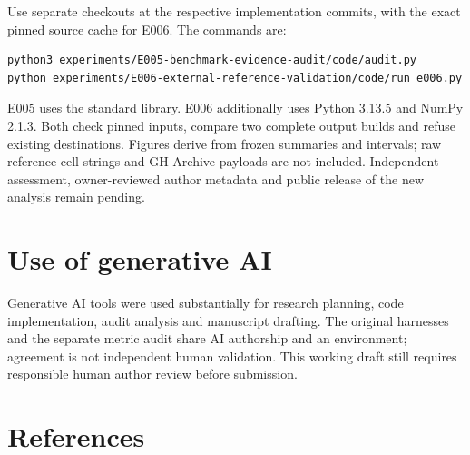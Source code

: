 Use separate checkouts at the respective implementation commits, with
the exact pinned source cache for E006. The commands are:

\begin{verbatim}
python3 experiments/E005-benchmark-evidence-audit/code/audit.py
python experiments/E006-external-reference-validation/code/run_e006.py
\end{verbatim}

E005 uses the standard library. E006 additionally uses Python 3.13.5 and
NumPy 2.1.3. Both check pinned inputs, compare two complete output
builds and refuse existing destinations. Figures derive from frozen
summaries and intervals; raw reference cell strings and GH Archive
payloads are not included. Independent assessment, owner-reviewed author
metadata and public release of the new analysis remain pending.

\hypertarget{use-of-generative-ai}{%
\section{Use of generative AI}\label{use-of-generative-ai}}

Generative AI tools were used substantially for research planning, code
implementation, audit analysis and manuscript drafting. The original
harnesses and the separate metric audit share AI authorship and an
environment; agreement is not independent human validation. This working
draft still requires responsible human author review before submission.

\hypertarget{references}{%
\section{References}\label{references}}

